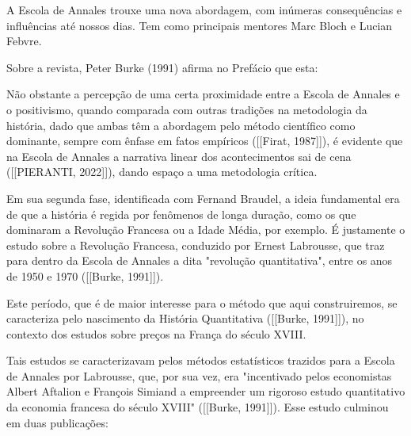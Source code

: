 A Escola de Annales trouxe uma nova abordagem, com inúmeras consequências e influências até nossos dias. Tem como principais mentores  Marc Bloch e Lucian Febvre.

Sobre a revista, Peter Burke (1991) afirma no Prefácio que esta:


\noindent\begin{center}\mbox{\centering{}}\end{center}


Não obstante a percepção de uma certa proximidade entre a Escola de Annales e o positivismo, quando comparada com outras tradições na metodologia da história, dado que ambas têm a abordagem pelo método científico como dominante, sempre com ênfase em fatos empíricos ([[Firat, 1987]]), é evidente que na Escola de Annales a narrativa linear dos acontecimentos sai de cena ([[PIERANTI, 2022]]), dando espaço a uma metodologia crítica.

Em sua segunda fase, identificada com Fernand Braudel, a ideia fundamental era de que a história é regida por fenômenos de longa duração, como os que dominaram a Revolução Francesa ou a Idade Média, por exemplo. É justamente o estudo sobre a Revolução Francesa, conduzido por Ernest Labrousse, que traz para dentro da Escola de Annales a dita "revolução quantitativa", entre os anos de 1950 e 1970  ([[Burke, 1991]]).

Este período, que é de maior interesse para o método que aqui construiremos, se caracteriza pelo nascimento da História Quantitativa ([[Burke, 1991]]), no contexto dos estudos sobre preços na França do século XVIII.

Tais estudos se caracterizavam pelos métodos estatísticos trazidos para a Escola de Annales por Labrousse, que, por sua vez, era "incentivado pelos economistas Albert Aftalion e François Simiand a empreender um rigoroso estudo quantitativo da economia francesa do século XVIII"  ([[Burke, 1991]]). Esse estudo culminou em duas publicações:


